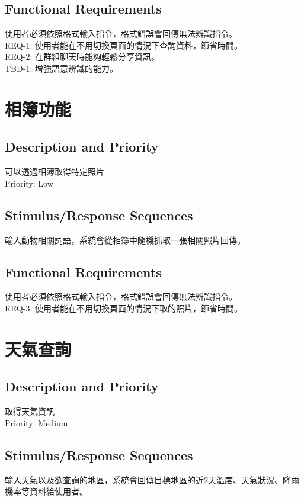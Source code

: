 \documentclass{scrreprt}
\begin{document}
\begin{CJK}{UTF8}{bkai}
\subsection{Functional Requirements}
使用者必須依照格式輸入指令，格式錯誤會回傳無法辨識指令。\\
REQ-1: 使用者能在不用切換頁面的情況下查詢資料，節省時間。\\
REQ-2: 在群組聊天時能夠輕鬆分享資訊。\\
TBD-1: 增強語意辨識的能力。\\

\section{相簿功能}

\subsection{Description and Priority}
可以透過相簿取得特定照片\\
Priority: Low

\subsection{Stimulus/Response Sequences}
輸入動物相關詞語，系統會從相簿中隨機抓取一張相關照片回傳。\\

\subsection{Functional Requirements}
使用者必須依照格式輸入指令，格式錯誤會回傳無法辨識指令。\\
REQ-3: 使用者能在不用切換頁面的情況下取的照片，節省時間。\\

\section{天氣查詢}

\subsection{Description and Priority}
取得天氣資訊\\
Priority: Medium\\

\subsection{Stimulus/Response Sequences}
輸入天氣以及欲查詢的地區，系統會回傳目標地區的近2天溫度、天氣狀況、降雨機率等資料給使用者。\\


\end{CJK}
\end{document}
